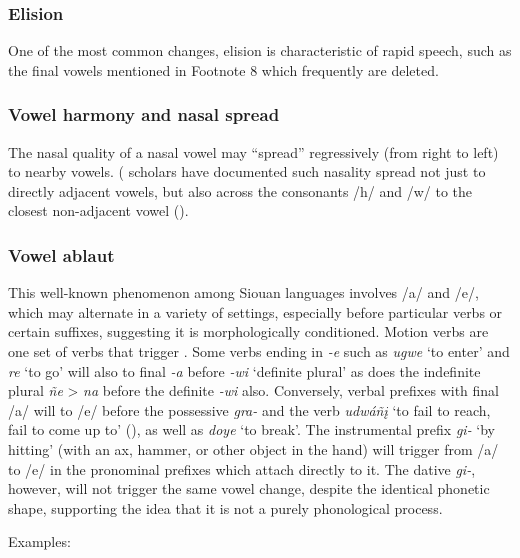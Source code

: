 \documentclass[output=paper]{LSP/langsci}
\begin{document}
\subsubsection{Elision}  One of the most common changes, elision is characteristic of rapid speech, such as the final vowels mentioned in Footnote 8 which frequently are deleted.  			

\subsubsection{Vowel harmony and nasal spread}  
The nasal quality of a nasal vowel may ``spread'' regressively (from right to left) to nearby vowels.  ( scholars have documented such nasality spread not just to directly adjacent vowels, but also across the consonants /h/ and /w/ to the closest non-adjacent vowel  (\citealt[7--8]{HelmbrechtLehmann2010}).  

\subsubsection{Vowel {ablaut}}  
This well-known phenomenon among Siouan languages involves /a/ and /e/, which may alternate in a variety of settings, especially before particular verbs or certain suffixes, suggesting it is morphologically conditioned.  Motion verbs are one set of verbs that trigger .  Some verbs ending in \textit{-e} such as \textit{ugwe} `to enter' and \textit{re} `to go' will also  to final \textit{-a}  before \textit{-wi} `definite plural' as does the indefinite plural \textit{ñe} > \textit{na} before the definite \textit{-wi} also.  Conversely, verbal prefixes with final /a/ will  to /e/ before the possessive \textit{gra-} and the verb \textit{udwáñ\k{i}} `to fail to reach, fail to come up to' (\citealt[239-40]{Whitman1947}), as well as \textit{doye} `to break'.  The instrumental prefix \textit{gi-} `by hitting' (with an ax, hammer, or other object in the hand) will trigger  from /a/ to /e/ in the pronominal prefixes which attach directly to it.  The dative \textit{gi-}, however, will not trigger the same vowel change, despite the identical phonetic shape, supporting the idea that it is not a purely phonological process.  

Examples:
\end{document}

